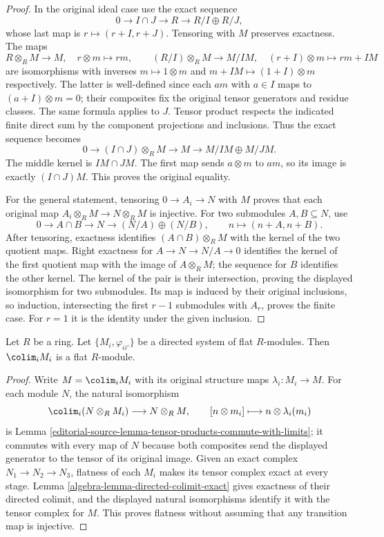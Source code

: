 \begin{proof}
In the original ideal case use the exact sequence
$$
0\longrightarrow I\cap J\longrightarrow R
\longrightarrow R/I\oplus R/J,
$$
whose last map is $r\mapsto(r+I,r+J)$. Tensoring with $M$
preserves exactness. The maps
$$
R\otimes_R M\longrightarrow M,\quad r\otimes m\longmapsto rm,
\qquad
(R/I)\otimes_R M\longrightarrow M/IM,\quad
(r+I)\otimes m\longmapsto rm+IM
$$
are isomorphisms with inverses $m\mapsto1\otimes m$ and
$m+IM\mapsto(1+I)\otimes m$ respectively. The latter is
well-defined since each $a m$ with $a\in I$ maps to
$(a+I)\otimes m=0$; their composites fix the original tensor
generators and residue classes. The same formula applies to
$J$. Tensor product respects the indicated finite direct sum
by the component projections and inclusions. Thus the exact
sequence becomes
$$
0\longrightarrow (I\cap J)\otimes_R M\longrightarrow M
\longrightarrow M/IM\oplus M/JM.
$$
The middle kernel is $IM\cap JM$. The first map sends
$a\otimes m$ to $am$, so its image is exactly $(I\cap J)M$.
This proves the original equality.

For the general statement, tensoring $0\to A_i\to N$ with
$M$ proves that each original map $A_i\otimes_R M\to N\otimes_R M$
is injective. For two submodules $A,B\subseteq N$, use
$$
0\longrightarrow A\cap B\longrightarrow N
\longrightarrow (N/A)\oplus(N/B),\qquad
n\longmapsto(n+A,n+B).
$$
After tensoring, exactness identifies
$(A\cap B)\otimes_R M$ with the kernel of the two quotient
maps. Right exactness for $A\to N\to N/A\to0$ identifies
the kernel of the first quotient map with the image of
$A\otimes_R M$; the sequence for $B$ identifies the other
kernel. The kernel of the pair is their intersection, proving
the displayed isomorphism for two submodules. Its map is
induced by their original inclusions, so induction, intersecting
the first $r-1$ submodules with $A_r$, proves the finite case.
For $r=1$ it is the identity under the given inclusion.
\end{proof}

\begin{lemma}
\label{editorial-source-lemma-colimit-flat}
Let $R$ be a ring. Let $\{M_i, \varphi_{ii'}\}$ be a directed system of
flat $R$-modules. Then $\colim_i M_i$ is a flat $R$-module.
\end{lemma}

\begin{proof}
Write $M=\colim_i M_i$ with its original structure maps
$\lambda_i:M_i\to M$. For each module $N$, the natural
isomorphism
$$
\colim_i(N\otimes_R M_i)\longrightarrow N\otimes_R M,
\qquad [n\otimes m_i]\longmapsto n\otimes\lambda_i(m_i)
$$
is Lemma \ref{editorial-source-lemma-tensor-products-commute-with-limits};
it commutes with every map of $N$ because both composites
send the displayed generator to the tensor of its original
image. Given an exact complex $N_1\to N_2\to N_3$, flatness
of each $M_i$ makes its tensor complex exact at every stage.
Lemma \ref{algebra-lemma-directed-colimit-exact} gives exactness of
their directed colimit, and the displayed natural isomorphisms
identify it with the tensor complex for $M$. This proves
flatness without assuming that any transition map is injective.
\end{proof}

